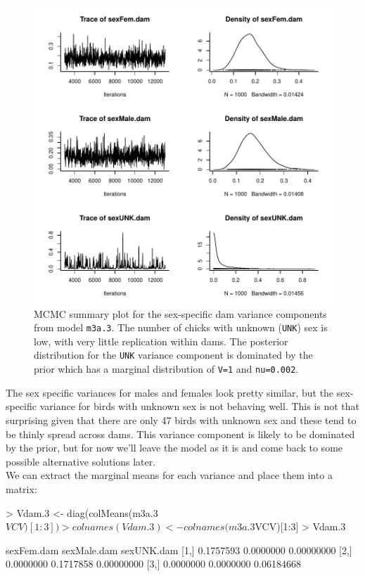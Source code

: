 \documentclass{article}
\begin{document}
\begin{figure}[!h]
\begin{center}
\includegraphics{Lecture3-018}
\end{center}
\caption{MCMC summary plot for the sex-specific dam variance components from model \texttt{m3a.3}. The number of chicks with unknown (\texttt{UNK}) sex is low, with very little replication within dams. The posterior distribution for the \texttt{UNK} variance component is dominated by the prior which has a marginal distribution of \texttt{V=1} and \texttt{nu=0.002}.}
\label{BTidh-fig}
\end{figure}

The sex specific variances for males and females look pretty similar, but the sex-specific variance for birds with unknown sex is not behaving well. This is not that surprising given that there are only 47 birds with unknown sex and these tend to be thinly spread across dams. This variance component is likely to be dominated by the prior, but for now we'll leave the model as it is and come back to some possible alternative solutions later.\\

We can extract the marginal means for each variance and place them into a matrix:

\begin{Schunk}
\begin{Sinput}
> Vdam.3 <- diag(colMeans(m3a.3$VCV)[1:3])
> colnames(Vdam.3) <- colnames(m3a.3$VCV)[1:3]
> Vdam.3
\end{Sinput}
\begin{Soutput}
     sexFem.dam sexMale.dam sexUNK.dam
[1,]  0.1757593   0.0000000 0.00000000
[2,]  0.0000000   0.1717858 0.00000000
[3,]  0.0000000   0.0000000 0.06184668
\end{Soutput}
\end{Schunk}
\end{document}
